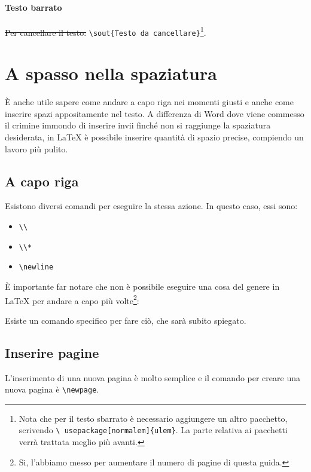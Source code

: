 \paragraph*{Testo barrato} \sout{Per cancellare il testo: }
\verb!\sout{Testo da cancellare}!\footnote{Nota che per il testo sbarrato è
necessario aggiungere un altro pacchetto, scrivendo \texttt{\textbackslash
usepackage[normalem]\{ulem\}}. La parte relativa ai pacchetti verrà trattata
meglio più avanti.}.

\section{A spasso nella spaziatura}

È anche utile sapere come andare a capo riga nei momenti giusti e anche come
inserire spazi appositamente nel testo. A differenza di Word dove viene
commesso il crimine immondo di inserire invii finché non si raggiunge la
spaziatura desiderata, in \LaTeX{} è possibile inserire quantità di spazio
precise, compiendo un lavoro più pulito.

\subsection{A capo riga}

Esistono diversi comandi per eseguire la stessa azione. In questo caso, essi
sono:
\begin{itemize}
 \item \verb!\\!
 \item \verb!\\*!
 \item \verb!\newline!
\end{itemize}

È importante far notare che non è possibile eseguire una cosa del genere in
\LaTeX{} per andare a capo più volte\footnote{Si, l'abbiamo messo per
aumentare il numero di pagine di questa guida.}:



Esiste un comando specifico per fare ciò, che sarà subito spiegato.

\subsection{Inserire pagine}

L'inserimento di una nuova pagina è molto semplice e il comando per creare una
nuova pagina è \verb!\newpage!.

